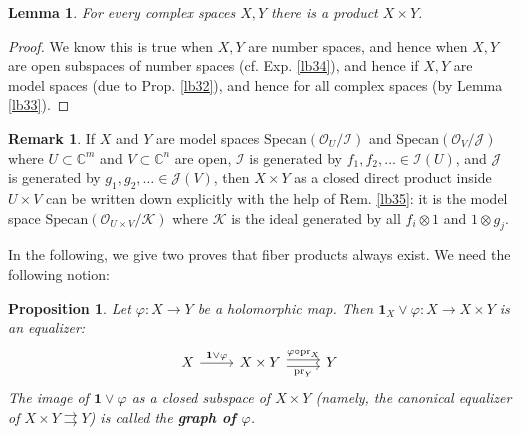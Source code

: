 \documentclass[12pt,b5paper,notitlepage]{report}
\theoremstyle{definition}
\newtheorem{rem}[df]{Remark}
\theoremstyle{plain}
\newtheorem{pp}[df]{Proposition}
\newtheorem{lm}[df]{Lemma}
\newcommand{\mc}{\mathcal}
\newcommand{\id}{\mathbf{1}}
\newcommand{\scr}{\mathscr}
\newcommand{\Cbb}{\mathbb C}
\newcommand{\pr}{\mathrm {pr}}
\newcommand{\Specan}{\mathrm{Specan}}
\numberwithin{equation}{section}
\begin{document}
\begin{lm}
For every complex spaces $X,Y$ there is a product $X\times Y$.
\end{lm}

\begin{proof}
We know this is true when $X,Y$ are number spaces, and hence when $X,Y$ are open subspaces of number spaces (cf. Exp. \ref{lb34}), and hence if $X,Y$ are model spaces (due to Prop. \ref{lb32}), and hence for all complex spaces (by Lemma \ref{lb33}).
\end{proof}



\begin{rem}
If $X$ and $Y$ are model spaces $\Specan(\scr O_U/\mc I)$ and $\Specan(\scr O_V/\mc J)$ where $U\subset\Cbb^m$ and $V\subset\Cbb^n$ are open,  $\mc I$ is generated by $f_1,f_2,\dots\in\mc I(U)$, and $\mc J$ is generated by $g_1,g_2,\dots\in\mc J(V)$, then $X\times Y$ as a closed direct product inside $U\times V$ can be written down explicitly with the help of Rem. \ref{lb35}: it is the model space $\Specan(\scr O_{U\times V}/\mc K)$ where $\mc K$ is the ideal generated by all $f_i\otimes 1$ and $1\otimes g_j$.
\end{rem}



In the following, we give two proves that fiber products always exist. We need the following notion:

\begin{pp}
Let $\varphi:X\rightarrow Y$ be a holomorphic map. Then $\id_X\vee\varphi:X\rightarrow X\times Y$ is an equalizer:
\begin{equation}
\begin{tikzcd}
X \arrow[r,"\id\vee\varphi"] & X\times Y \arrow[r, shift left, "\varphi\circ\pr_X"] \arrow[r, shift right, "\pr_Y"'] & Y
\end{tikzcd}
\end{equation}
The image of $\id\vee\varphi$ as a closed subspace of $X\times Y$ (namely, the canonical equalizer of $X\times Y\rightrightarrows Y$) is called the \textbf{graph of $\varphi$}. 
\end{pp}
\end{document}
